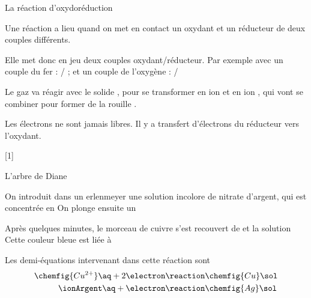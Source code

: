 \begin{doc}{La réaction d'oxydoréduction}
  \begin{importants}
    Une réaction  a lieu quand on met en contact un oxydant et un réducteur de deux couples différents.
  \end{importants}
  
  Elle met donc en jeu deux couples oxydant/réducteur.
  Par exemple avec un couple du fer : \ionFerIII/ ; et un couple de l'oxygène : \dioxygene/\ionOxygene

  Le gaz \dioxygene va réagir avec le solide , pour se transformer en ion \ionFerIII et en ion \ionOxygene, qui vont se combiner pour former de la rouille .

  \begin{importants}
    Les électrons ne sont jamais libres.
    Il y a transfert d'électrons du réducteur vers l'oxydant.
  \end{importants}
\end{doc}

[1]

\begin{doc}{L'arbre de Diane}

  \moleculesGras
  On introduit dans un erlenmeyer une solution incolore de nitrate d'argent, qui est concentrée en 
  On plonge ensuite un 

  Après quelques minutes, le morceau de cuivre s'est recouvert de  et la solution 
  Cette couleur bleue est liée à 
  \moleculesNormales

  Les demi-équations intervenant dans  cette réaction sont
  \begin{align*}
    \chemfig{Cu^{2+}}\aq + 2\electron &\reaction \chemfig{Cu}\sol \\
    \ionArgent\aq + \electron &\reaction \chemfig{Ag}\sol
  \end{align*}
\end{doc}

